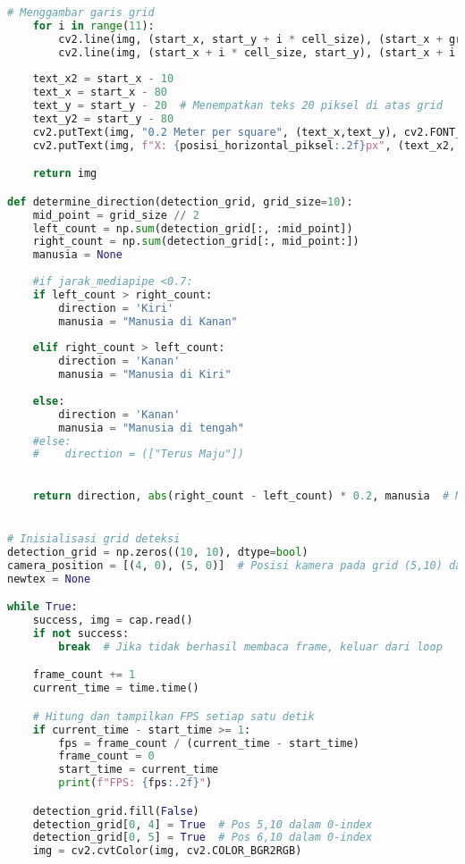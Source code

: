 \begin{lstlisting}[language=Python]
    # Menggambar garis grid
    for i in range(11):
        cv2.line(img, (start_x, start_y + i * cell_size), (start_x + grid_size, start_y + i * cell_size), (255, 255, 255), 1)
        cv2.line(img, (start_x + i * cell_size, start_y), (start_x + i * cell_size, start_y + grid_size), (255, 255, 255), 1)
    
    text_x2 = start_x - 10
    text_x = start_x - 80
    text_y = start_y - 20  # Menempatkan teks 20 piksel di atas grid
    text_y2 = start_y - 80
    cv2.putText(img, "0.2 Meter per square", (text_x,text_y), cv2.FONT_HERSHEY_SCRIPT_SIMPLEX, 0.6, (255,255,255), 1)
    cv2.putText(img, f"X: {posisi_horizontal_piksel:.2f}px", (text_x2, text_y2), cv2.FONT_HERSHEY_SIMPLEX, 0.6, (255, 255, 255), 1)

    return img

def determine_direction(detection_grid, grid_size=10):
    mid_point = grid_size // 2
    left_count = np.sum(detection_grid[:, :mid_point])
    right_count = np.sum(detection_grid[:, mid_point:])
    manusia = None
    
    #if jarak_mediapipe <0.7:
    if left_count > right_count:
        direction = 'Kiri'
        manusia = "Manusia di Kanan"
    
    elif right_count > left_count:
        direction = 'Kanan'
        manusia = "Manusia di Kiri"
            
    else:
        direction = 'Kanan'
        manusia = "Manusia di tengah"
    #else:
    #    direction = (["Terus Maju"])

        
    return direction, abs(right_count - left_count) * 0.2, manusia  # Misalkan setiap kotak mewakili 0.2 meter


# Inisialisasi grid deteksi
detection_grid = np.zeros((10, 10), dtype=bool)
camera_position = [(4, 0), (5, 0)]  # Posisi kamera pada grid (5,10) dan (6,10)
newtex = None

while True:
    success, img = cap.read()
    if not success:
        break  # Jika tidak berhasil membaca frame, keluar dari loop

    frame_count += 1
    current_time = time.time()

    # Hitung dan tampilkan FPS setiap satu detik
    if current_time - start_time >= 1:
        fps = frame_count / (current_time - start_time)
        frame_count = 0
        start_time = current_time
        print(f"FPS: {fps:.2f}")

    detection_grid.fill(False)
    detection_grid[0, 4] = True  # Pos 5,10 dalam 0-index
    detection_grid[0, 5] = True  # Pos 6,10 dalam 0-index
    img = cv2.cvtColor(img, cv2.COLOR_BGR2RGB)


\end{lstlisting}
